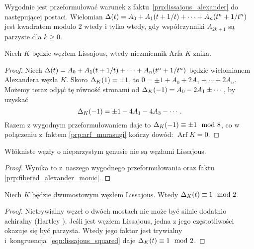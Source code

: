 Wygodnie jest przeformułować warunek z faktu~\ref{prp:lissajous_alexander} do następującej postaci.
Wielomian $\Delta(t) = A_0 + A_1(t+1/t) + \cdots + A_n(t^n + 1/t^n)$ jest kwadratem modulo $2$ wtedy i tylko wtedy, gdy współczynniki $A_{2k+1}$ są parzyste dla $k \ge 0$.

\begin{corollary}
%
    Niech $K$ będzie węzłem Lissajous, wtedy niezmiennik Arfa $K$ znika.
\end{corollary}

\begin{proof}
    Niech $\Delta(t) = A_0 + A_1(t+1/t) + \cdots + A_n(t^n + 1/t^n)$ będzie wielomianem Alexandera węzła $K$.
    Skoro $\Delta_K(1) = \pm 1$, to $0 = \pm 1 + A_0 + 2A_1 + \cdots + 2A_n$.
    Możemy teraz odjąć tę równość stronami od $\Delta_K(-1) = A_0 - 2A_1 \pm \cdots$, by uzyskać
    \begin{equation}
        \Delta_K(-1) = \pm 1 - 4A_1 - 4A_3 - \cdots.
    \end{equation}
    Razem z wygodnym przeformułowaniem daje to $\Delta_K(-1) \equiv \pm 1 \mod 8$, co w połączeniu z~faktem \ref{prp:arf_murasugi} kończy dowód: $\operatorname{Arf} K = 0$.
\end{proof}

\begin{corollary}
%
\label{cor:lissajous_fibered}%
    Włókniste węzły o nieparzystym genusie nie są węzłami Lissajous.
\end{corollary}

\begin{proof}
    Wynika to z~naszego wygodnego przeformułowania oraz faktu \ref{prp:fibered_alexander_monic}.
\end{proof}

\begin{corollary}
%
%
\label{cor:lissajous_twobridge}%
    Niech $K$ będzie dwumostowym węzłem Lissajous.
    Wtedy $\Delta_K(t) \equiv 1 \mod 2$.
\end{corollary}

\begin{proof}
    Nietrywialny węzeł o dwóch mostach nie może być silnie dodatnio achiralny (Hartley \cite{hartley1979}).
    Jeśli jest węzłem Lissajous, jedna z jego częstotliwości okazuje się być parzysta.
    Wtedy jego faktor jest trywialny i~kongruencja~\ref{eqn:lissajous_squared} daje $\Delta_K(t) \equiv 1 \mod 2$.
%
\end{proof}

